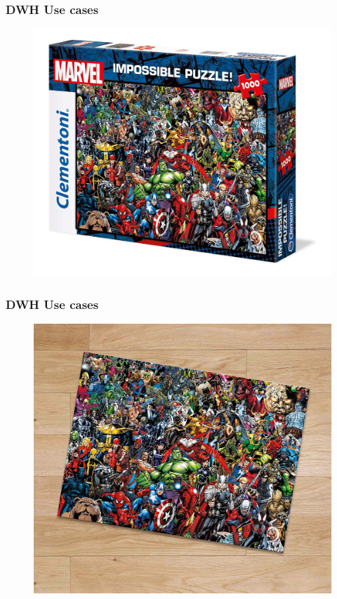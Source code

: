 \begin{frame}
\frametitle{DWH Use cases}
\begin{figure}[ht]

\centering
\includegraphics[width=\linewidth,height=.8\textheight]{./Figures/chapter-01/Marvel-03.jpg}
\end{figure}
\end{frame}

\begin{frame}
\frametitle{DWH Use cases}
\begin{figure}[ht]

\centering
\includegraphics[width=\linewidth,height=.8\textheight]{./Figures/chapter-01/Marvel-02.jpg}
\end{figure}
\end{frame}


